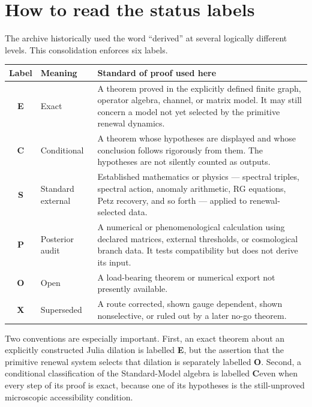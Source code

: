 \documentclass[11pt,oneside,openany]{book}
\numberwithin{equation}{chapter}
\theoremstyle{definition}
\theoremstyle{remark}
\newcommand{\statusE}{\textcolor{ExactColor}{\textbf{E}}}
\newcommand{\statusC}{\textcolor{CondColor}{\textbf{C}}}
\newcommand{\statusS}{\textcolor{StdColor}{\textbf{S}}}
\newcommand{\statusP}{\textcolor{PostColor}{\textbf{P}}}
\newcommand{\statusO}{\textcolor{OpenColor}{\textbf{O}}}
\newcommand{\statusX}{\textcolor{SuperColor}{\textbf{X}}}
\begin{document}
\chapter*{How to read the status labels}
The archive historically used the word ``derived'' at several logically different levels.  This consolidation enforces six labels.

\begin{center}
\begin{tabularx}{0.96\textwidth}{@{}c p{} X@{}}
\toprule
Label & Meaning & Standard of proof used here\\
\midrule
\statusE & Exact & A theorem proved in the explicitly defined finite graph, operator algebra, channel, or matrix model.  It may still concern a model not yet selected by the primitive renewal dynamics.\\
\statusC & Conditional & A theorem whose hypotheses are displayed and whose conclusion follows rigorously from them.  The hypotheses are not silently counted as outputs.\\
\statusS & Standard external & Established mathematics or physics --- spectral triples, spectral action, anomaly arithmetic, RG equations, Petz recovery, and so forth --- applied to renewal-selected data.\\
\statusP & Posterior audit & A numerical or phenomenological calculation using declared matrices, external thresholds, or cosmological branch data.  It tests compatibility but does not derive its input.\\
\statusO & Open & A load-bearing theorem or numerical export not presently available.\\
\statusX & Superseded & A route corrected, shown gauge dependent, shown nonselective, or ruled out by a later no-go theorem.\\
\bottomrule
\end{tabularx}
\end{center}

Two conventions are especially important.  First, an exact theorem about an explicitly constructed Julia dilation is labelled \statusE, but the assertion that the primitive renewal system selects that dilation is separately labelled \statusO.  Second, a conditional classification of the Standard-Model algebra is labelled \statusC even when every step of its proof is exact, because one of its hypotheses is the still-unproved microscopic accessibility condition.
\end{document}
